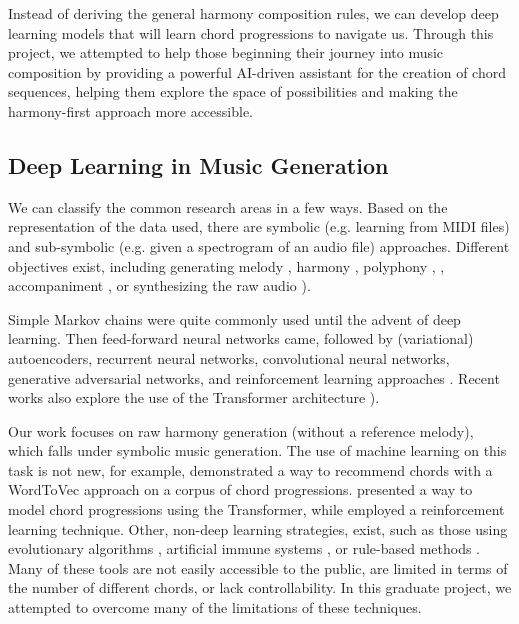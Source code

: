 \documentclass{article}
\begin{document}
Instead of deriving the general harmony composition rules, we can develop deep learning models that will learn chord progressions to navigate us. Through this project, we attempted to help those beginning their journey into music composition by providing a powerful AI-driven assistant for the creation of chord sequences, helping them explore the space of possibilities and making the harmony-first approach more accessible.

\subsection{Deep Learning in Music Generation}

We can classify the common research areas in a few ways. Based on the representation of the data used, there are symbolic (e.g. learning from MIDI files) and sub-symbolic (e.g. given a spectrogram of an audio file) approaches. Different objectives exist, including generating melody \cite{DBLP:journals/corr/abs-2109-00663}, harmony \cite{9053992, dalmazzo2023chordinator, 8554901}, polyphony \cite{DBLP:journals/corr/abs-1710-11418}, \cite{DBLP:journals/corr/abs-1804-09399}, accompaniment \cite{10.1145/3394171.3413721, 10.1145/1357054.1357169, Jiang_Jin_Duan_Zhang_2020}, or synthesizing the raw audio \cite{mubert2022, forsgren2022riffusion, agostinelli2023musiclm}).

Simple Markov chains were quite commonly used until the advent of deep learning. Then feed-forward neural networks came, followed by (variational) autoencoders, recurrent neural networks, convolutional neural networks, generative adversarial networks, and reinforcement learning approaches \cite{DBLP:journals/corr/abs-1709-01620}. Recent works also explore the use of the Transformer architecture \cite{https://doi.org/10.1049/cit2.12065, dhariwal2020jukebox, 9768298, Muhamed_Li_Shi_Yaddanapudi_Chi_Jackson_Suresh_Lipton_Smola_2021}).

Our work focuses on raw harmony generation (without a reference melody), which falls under symbolic music generation. The use of machine learning on this task is not new, for example, \cite{huang16chordripple} demonstrated a way to recommend chords with a WordToVec approach on a corpus of chord progressions. \cite{dalmazzo:hal-04289026} presented a way to model chord progressions using the Transformer, while \cite{8554901} employed a reinforcement learning technique. Other, non-deep learning strategies, exist, such as those using evolutionary algorithms \cite{10.1007/978-3-319-13560-1_69}, artificial immune systems \cite{NAVARROCACERES2019100543}, or rule-based methods \cite{doi:10.1080/09298215.2016.1173708}. Many of these tools are not easily accessible to the public, are limited in terms of the number of different chords, or lack controllability. In this graduate project, we attempted to overcome many of the limitations of these techniques.
\end{document}
